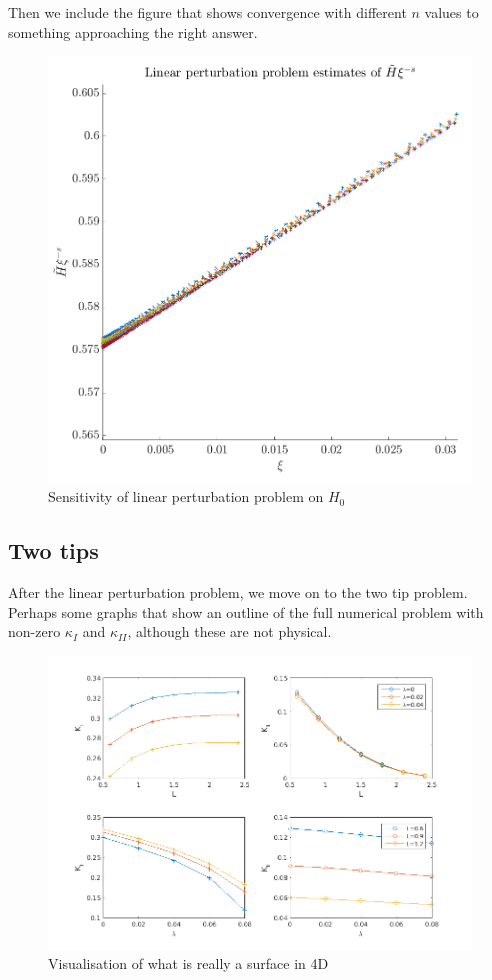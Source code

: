 \documentclass{jfm}
\begin{document}
Then we include the figure that shows convergence with different $n$ values
to something approaching the right answer.
\begin{figure}
 \centerline{
\includegraphics[scale=0.2]{./../../Graphs/linear-perturbation-plot.png}}
  \caption{Sensitivity of linear perturbation problem on $H_0$}
\end{figure}

\subsection{Two tips}
After the linear perturbation problem, we move on to the two tip
problem. Perhaps some graphs that show an outline of the full numerical problem
with non-zero $\kappa_I$ and $\kappa_{II}$, although these are not physical.
\begin{figure}
 \centerline{
\includegraphics[scale=0.3]{./../../Graphs/KI-KII.png}}
  \caption{Visualisation of what is really a surface in 4D}
\end{figure}
\end{document}
